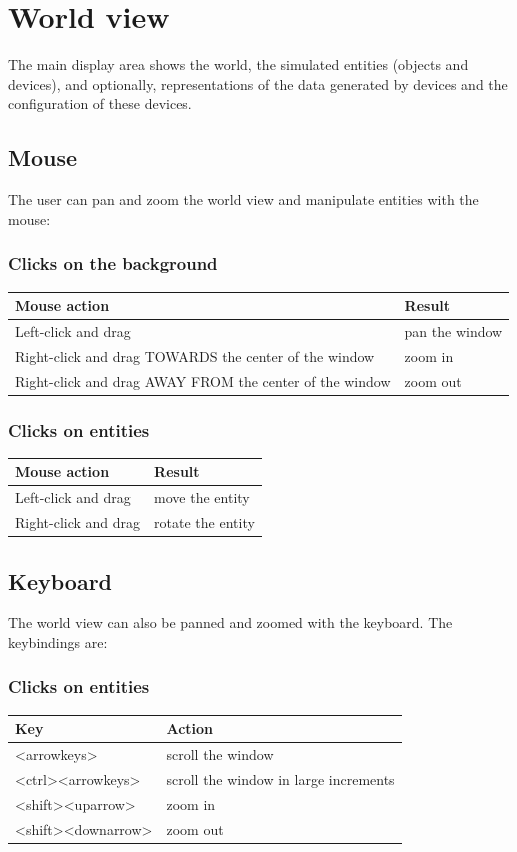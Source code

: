 \documentclass[letter,11pt,twoside]{report}
\begin{document}
\section{World view}
The main display area shows the world, the simulated entities (objects
and devices), and optionally, representations of the data generated by
devices and the configuration of these devices.

\subsection{Mouse}
The user can pan and zoom the world view and manipulate entities with
the mouse:

\subsubsection*{Clicks on the background}

\begin{tabular}{|l|l|}
\hline Mouse action & Result\\\hline
Left-click and drag & pan the window\\
Right-click and drag TOWARDS the center of the window & zoom in\\
Right-click and drag AWAY FROM the center of the window & zoom out\\ 
\hline
\end{tabular}

\subsubsection*{Clicks on entities}
\begin{tabular}{|l|l|}
\hline Mouse action & Result\\\hline
Left-click and drag & move the entity\\
Right-click and drag & rotate the entity\\
\hline
\end{tabular}

\subsection{Keyboard}
The world view can also be panned and zoomed with the keyboard. The
keybindings are:

\subsubsection*{Clicks on entities}
\begin{tabular}{|l|l|}
\hline Key & Action\\ \hline
<arrowkeys>        & scroll the window \\
<ctrl><arrowkeys>  & scroll the window in large increments \\
<shift><uparrow>   & zoom in \\
<shift><downarrow> & zoom out \\
\hline 
\end{tabular}
\end{document}
